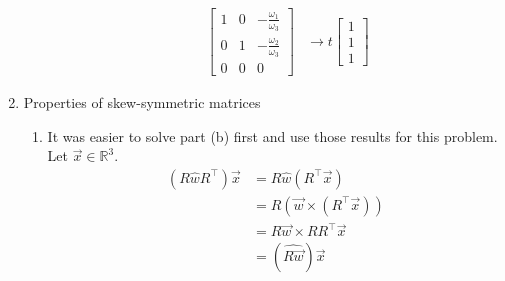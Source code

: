 \documentclass[12pt]{article}
\newcommand{\R}{\mathbb{R}}
\begin{document}
\begin{enumerate}
\begin{enumerate}
\begin{enumerate}
\begin{align*}
                                \begin{bmatrix}
                                    1 & 0  & -\frac{\omega_1}{\omega_3}\\ 
                                    0 & 1  & -\frac{\omega_2}{\omega_3}\\
                                    0 & 0 & 0
                                \end{bmatrix} &\rightarrow t \begin{bmatrix}
                                                                1\\ 
                                                                1\\ 
                                                                1
                                                            \end{bmatrix}
                            \end{align*}
                    \end{enumerate}
            \end{enumerate}
        \item Properties of skew-symmetric matrices
            \begin{enumerate}
                \item It was easier to solve part (b) first and use those results for this problem.
                    Let $\vec{x} \in \R^3$. 
                    \begin{align}
                        (R \widehat{w} R^\top) \vec{x} &= R \widehat{w} (R^\top \vec{x}) \\
                                                &= R (\vec{w} \times (R^\top \vec{x})) \\
                                                &= R \vec{w} \times R R^\top \vec{x} \\
                                                &= (\widehat{R \vec{w}}) \vec{x}
                    \end{align}
                    

\end{enumerate}
\end{enumerate}
\end{document}
